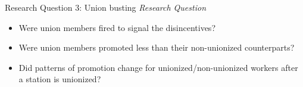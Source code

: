 \begin{frame}{Research Question 3: Union busting}
\emph{Research Question}
\begin{itemize}
    \item Were union members fired to signal the disincentives?
    \item Were union members promoted less than their non-unionized counterparts?
    \item Did patterns of promotion change for unionized/non-unionized workers after a station is unionized?
\end{itemize}
\end{frame}